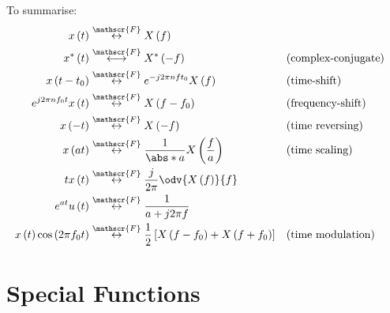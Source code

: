 \documentclass{article}
\begin{document}
To summarise:
\begin{align*}
    x\left( t \right)                                 & \overset{\mathscr{F}}{\leftrightarrow} X\left( f \right)                                                                                            \\
    x^\ast\left( t \right)                            & \overset{\mathscr{F}}{\longleftrightarrow} X^\ast\left( -f \right)                                                  &  & \text{(complex-conjugate)} \\
    x\left( t - t_0 \right)                           & \overset{\mathscr{F}}{\leftrightarrow} e^{-j 2\pi n f t_0} X\left( f \right)                                        &  & \text{(time-shift)}        \\
    e^{j 2\pi n f_0 t} x\left( t \right)              & \overset{\mathscr{F}}{\leftrightarrow} X\left( f - f_0 \right)                                                      &  & \text{(frequency-shift)}   \\
    x\left( -t \right)                                & \overset{\mathscr{F}}{\leftrightarrow} X\left( -f \right)                                                           &  & \text{(time reversing)}    \\
    x\left( at \right)                                & \overset{\mathscr{F}}{\leftrightarrow} \frac{1}{\abs*{a}} X\left( \frac{f}{a} \right)                               &  & \text{(time scaling)}      \\
    t x\left( t \right)                               & \overset{\mathscr{F}}{\leftrightarrow} \frac{j}{2\pi} \odv{X\left( f \right)}{f}                                                                    \\
    e^{at} u\left( t \right)                          & \overset{\mathscr{F}}{\leftrightarrow} \frac{1}{a + j 2\pi f}                                                                                       \\
    x\left( t \right) \cos{\left( 2\pi f_0 t \right)} & \overset{\mathscr{F}}{\leftrightarrow} \frac{1}{2} \left[ X\left( f - f_0 \right) + X\left( f + f_0 \right) \right] &  & \text{(time modulation)}
\end{align*}
\section{Special Functions}
\end{document}
